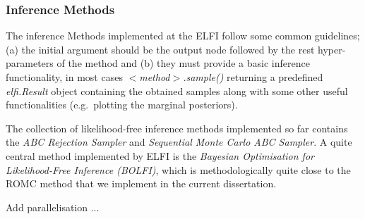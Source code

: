 \subsubsection{Inference Methods}
\label{sec:inference-methods}

The inference Methods implemented at the ELFI follow some common
guidelines; (a) the initial argument should be the output node
followed by the rest hyper-parameters of the method and (b) they must
provide a basic inference functionality, in most cases
$<$\textit{method}$>$\textit{.sample()} returning a predefined
\textit{elfi.Result} object containing the obtained samples along with
some other useful functionalities (e.g.\ plotting the marginal
posteriors).

The collection of likelihood-free inference methods implemented so far
contains the \textit{ABC Rejection Sampler} and \textit{Sequential
  Monte Carlo ABC Sampler}. A quite central method implemented by ELFI
is the \textit{Bayesian Optimisation for Likelihood-Free Inference
  (BOLFI)}, which is methodologically quite close to the ROMC method
that we implement in the current dissertation.

Add parallelisation ...


